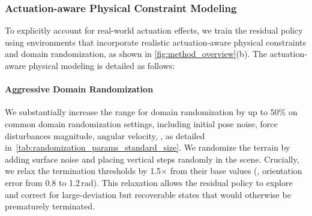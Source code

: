  \subsubsection{Actuation-aware Physical Constraint Modeling}
To explicitly account for real-world actuation effects, we train the residual policy
using environments that incorporate realistic actuation-aware physical constraints
and domain randomization, as shown in \cref{fig:method_overview}(b). The actuation-aware physical modeling is detailed as follows:

\paragraph{Aggressive Domain Randomization}
We substantially increase the range for domain randomization by up to 50\% on common domain randomization settings, including initial pose noise, force disturbances magnitude, angular velocity, \etc, as detailed in~\cref{tab:randomization_params_standard_size}. We randomize the terrain by adding surface noise and placing vertical steps randomly in the scene. Crucially, we relax the termination thresholds by 1.5$\times$ from their base values (\eg, orientation error from 0.8 to 1.2\,rad). This relaxation allows the residual policy to explore and correct for large-deviation but recoverable states that would otherwise be prematurely terminated.%

